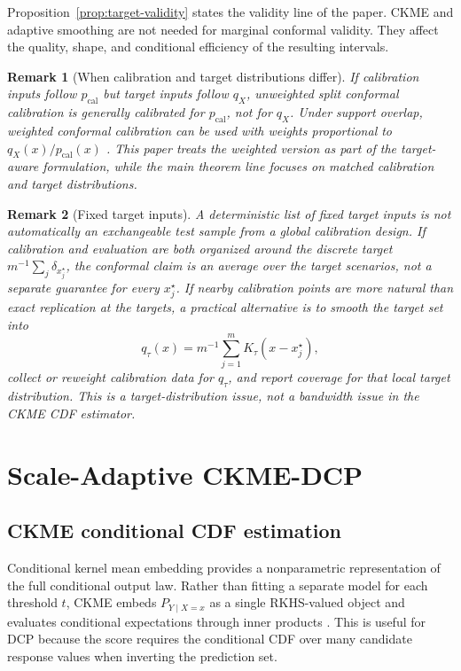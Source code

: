 \documentclass[11pt]{article}
\newtheorem{remark}{Remark}
\begin{document}
Proposition~\ref{prop:target-validity} states the validity line of the paper. CKME and adaptive smoothing are not needed for marginal conformal validity. They affect the quality, shape, and conditional efficiency of the resulting intervals.

\begin{remark}[When calibration and target distributions differ]
If calibration inputs follow \(p_{\mathrm{cal}}\) but target inputs follow \(q_X\), unweighted split conformal calibration is generally calibrated for \(p_{\mathrm{cal}}\), not for \(q_X\). Under support overlap, weighted conformal calibration can be used with weights proportional to \(q_X(x)/p_{\mathrm{cal}}(x)\) \cite{tibshirani2019}. This paper treats the weighted version as part of the target-aware formulation, while the main theorem line focuses on matched calibration and target distributions.
\end{remark}

\begin{remark}[Fixed target inputs]
A deterministic list of fixed target inputs is not automatically an exchangeable test sample from a global calibration design. If calibration and evaluation are both organized around the discrete target \(m^{-1}\sum_j\delta_{x_j^\star}\), the conformal claim is an average over the target scenarios, not a separate guarantee for every \(x_j^\star\). If nearby calibration points are more natural than exact replication at the targets, a practical alternative is to smooth the target set into
\[
  q_\tau(x)=m^{-1}\sum_{j=1}^m K_\tau(x-x_j^\star),
\]
collect or reweight calibration data for \(q_\tau\), and report coverage for that local target distribution. This is a target-distribution issue, not a bandwidth issue in the CKME CDF estimator.
\end{remark}

\section{Scale-Adaptive CKME-DCP}
\label{sec:method}

\subsection{CKME conditional CDF estimation}

Conditional kernel mean embedding provides a nonparametric representation of the full conditional output law. Rather than fitting a separate model for each threshold \(t\), CKME embeds \(P_{Y\mid X=x}\) as a single RKHS-valued object and evaluates conditional expectations through inner products \cite{song2013,muandet2017}. This is useful for DCP because the score requires the conditional CDF over many candidate response values when inverting the prediction set.
\end{document}
